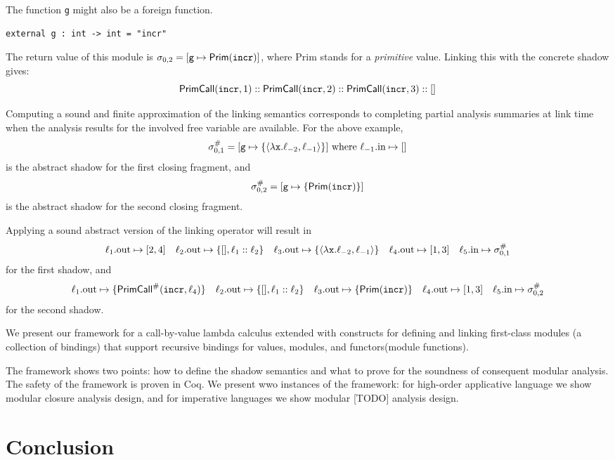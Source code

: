 \documentclass{article}
\begin{document}
The function \texttt{g} might also be a foreign function.
\begin{center}
  \begin{BVerbatim}
external g : int -> int = "incr"
  \end{BVerbatim}
\end{center}
The return value of this module is $\sigma_{0,2}=[\texttt{g}\mapsto\textsf{Prim}(\texttt{incr})]$, where \textsf{Prim} stands for a \emph{primitive} value.
Linking this with the concrete shadow gives:
\[\textsf{PrimCall}(\texttt{incr},1)::\textsf{PrimCall}(\texttt{incr},2)::\textsf{PrimCall}(\texttt{incr},3)::[]\]

Computing a sound and finite approximation of the linking semantics
corresponds to completing partial analysis summaries at link time when
the analysis results for the involved free variable are available. For
the above example,
\[
  {\sigma}^{\#}_{0,1}=[\texttt{g}\mapsto\{\langle\lambda\texttt{x}.\ell_{-2},\ell_{-1}\rangle\}]\text{ where }
  \ell_{-1}.\text{in}\mapsto[]
\]
is the abstract shadow for the first closing fragment, and
\[
  {\sigma}^{\#}_{0,2}=[\texttt{g}\mapsto\{\textsf{Prim}(\texttt{incr})\}]
\]
is the abstract shadow for the second closing fragment.

Applying a sound abstract version of the linking operator will result in
\[
  \ell_1.\text{out}\mapsto[2,4]\quad
  \ell_2.\text{out}\mapsto\{[],\ell_1:: \ell_2\}\quad
  \ell_3.\text{out}\mapsto\{\langle\lambda\texttt{x}.\ell_{-2},\ell_{-1}\rangle\}\quad
  \ell_4.\text{out}\mapsto[1,3]\quad
  \ell_5.\text{in}\mapsto{\sigma}^{\#}_{0,1}
\]
for the first shadow, and
\[
  \ell_1.\text{out}\mapsto\{{\textsf{PrimCall}}^{\#}(\texttt{incr},\ell_4)\}\quad
  \ell_2.\text{out}\mapsto\{[],\ell_1:: \ell_2\}\quad
  \ell_3.\text{out}\mapsto\{\textsf{Prim}(\texttt{incr})\}\quad
  \ell_4.\text{out}\mapsto[1,3]\quad
  \ell_5.\text{in}\mapsto{\sigma}^{\#}_{0,2}
\]
for the second shadow.

We present our framework for a call-by-value lambda calculus extended
with constructs for defining and linking first-class modules (a
collection of bindings) that support recursive bindings for values,
modules, and functors(module functions).

The framework shows two points: how to define the shadow semantics and
what to prove for the soundness of consequent modular analysis. The
safety of the framework is proven in Coq. We present wwo instances of the
framework: for high-order applicative language we show modular
closure analysis design, and for imperative languages we show modular
  [TODO] analysis design.


\clearpage

\clearpage


\section{Conclusion}
\end{document}
